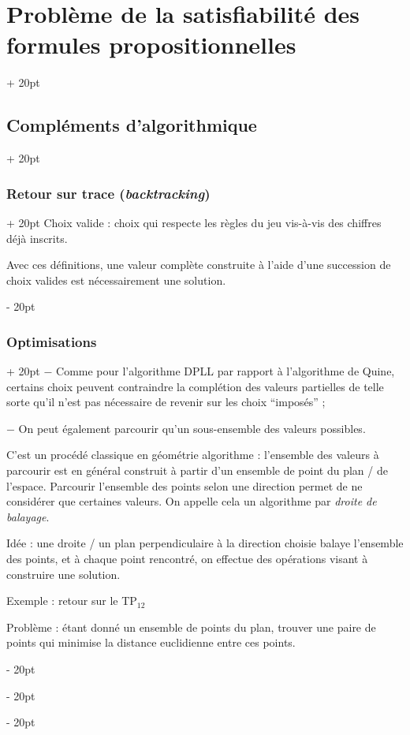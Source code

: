 \documentclass[a4paper, 12pt, twoside]{article}
\newcommand{\ind}[1][20pt]{\advance\leftskip + #1}
\newcommand{\deind}[1][20pt]{\advance\leftskip - #1}
\newenvironment{indt}[2][20pt]{#2 \par \ind[#1]}{\par \deind} %
\begin{document}
\begin{indt}{\section{Problème de la satisfiabilité des formules propositionnelles}}
\begin{indt}{\subsection{Compléments d'algorithmique}}
\begin{indt}{\subsubsection{Retour sur trace (\textit{backtracking})}}
                Choix valide : choix qui respecte les règles du jeu vis-à-vis des chiffres déjà inscrits.
                
                \vspace{12pt}
                
                Avec ces définitions, une valeur complète construite à l'aide d'une succession de choix valides est nécessairement une solution.
            \end{indt}
            
            \vspace{12pt}
            
            \begin{indt}{\subsubsection{Optimisations}}
                $-$ Comme pour l'algorithme DPLL par rapport à l'algorithme de Quine, certains choix peuvent contraindre la complétion des valeurs partielles de telle sorte qu'il n'est pas nécessaire de revenir sur les choix ``imposés'' ;
                
                \vspace{12pt}
                
                $-$ On peut également parcourir qu'un sous-ensemble des valeurs possibles.
                
                C'est un procédé classique en géométrie algorithme : l'ensemble des valeurs à parcourir est en général construit à partir d'un ensemble de point du plan / de l'espace. Parcourir l'ensemble des points selon une direction permet de ne considérer que certaines valeurs. On appelle cela un algorithme par \textit{droite de balayage}.
                
                \vspace{12pt}
                
                Idée : une droite / un plan perpendiculaire à la direction choisie balaye l'ensemble des points, et à chaque point rencontré, on effectue des opérations visant à construire une solution.
                
                Exemple : retour sur le TP$_{12}$
                
                Problème : étant donné un ensemble de points du plan, trouver une paire de points qui minimise la distance euclidienne entre ces points.
                

\end{indt}
\end{indt}
\end{indt}
\end{document}
